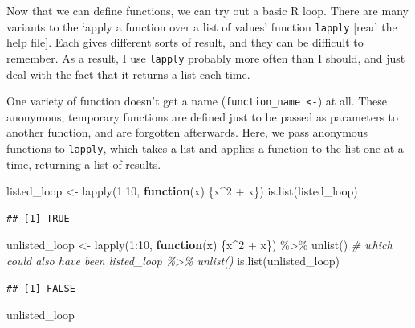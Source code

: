 \documentclass[
]{book}
\newenvironment{Shaded}{\begin{snugshade}}{\end{snugshade}}
\newcommand{\CommentTok}[1]{\textcolor[rgb]{0.56,0.35,0.01}{\textit{#1}}}
\newcommand{\ControlFlowTok}[1]{\textcolor[rgb]{0.13,0.29,0.53}{\textbf{#1}}}
\newcommand{\DecValTok}[1]{\textcolor[rgb]{0.00,0.00,0.81}{#1}}
\newcommand{\FunctionTok}[1]{\textcolor[rgb]{0.00,0.00,0.00}{#1}}
\newcommand{\NormalTok}[1]{#1}
\newcommand{\OtherTok}[1]{\textcolor[rgb]{0.56,0.35,0.01}{#1}}
\newcommand{\SpecialCharTok}[1]{\textcolor[rgb]{0.00,0.00,0.00}{#1}}
\begin{document}
Now that we can define functions, we can try out a basic R loop. There are many variants to the `apply a function over a list of values' function \texttt{lapply} {[}read the help file{]}. Each gives different sorts of result, and they can be difficult to remember. As a result, I use \texttt{lapply} probably more often than I should, and just deal with the fact that it returns a list each time.

One variety of function doesn't get a name (\texttt{function\_name\ \textless{}-}) at all. These anonymous, temporary functions are defined just to be passed as parameters to another function, and are forgotten afterwards. Here, we pass anonymous functions to \texttt{lapply}, which takes a list and applies a function to the list one at a time, returning a list of results.

\begin{Shaded}
\begin{Highlighting}[]
\NormalTok{listed\_loop }\OtherTok{\textless{}{-}} \FunctionTok{lapply}\NormalTok{(}\DecValTok{1}\SpecialCharTok{:}\DecValTok{10}\NormalTok{, }\ControlFlowTok{function}\NormalTok{(x) \{x}\SpecialCharTok{\^{}}\DecValTok{2} \SpecialCharTok{+}\NormalTok{ x\})}
\FunctionTok{is.list}\NormalTok{(listed\_loop)}
\end{Highlighting}
\end{Shaded}

\begin{verbatim}
## [1] TRUE
\end{verbatim}

\begin{Shaded}
\begin{Highlighting}[]
\NormalTok{unlisted\_loop }\OtherTok{\textless{}{-}} \FunctionTok{lapply}\NormalTok{(}\DecValTok{1}\SpecialCharTok{:}\DecValTok{10}\NormalTok{, }\ControlFlowTok{function}\NormalTok{(x) \{x}\SpecialCharTok{\^{}}\DecValTok{2} \SpecialCharTok{+}\NormalTok{ x\}) }\SpecialCharTok{\%\textgreater{}\%} 
  \FunctionTok{unlist}\NormalTok{()}
\CommentTok{\# which could also have been listed\_loop \%\textgreater{}\% unlist()}
\FunctionTok{is.list}\NormalTok{(unlisted\_loop)}
\end{Highlighting}
\end{Shaded}

\begin{verbatim}
## [1] FALSE
\end{verbatim}

\begin{Shaded}
\begin{Highlighting}[]
\NormalTok{unlisted\_loop}
\end{Highlighting}
\end{Shaded}
\end{document}
